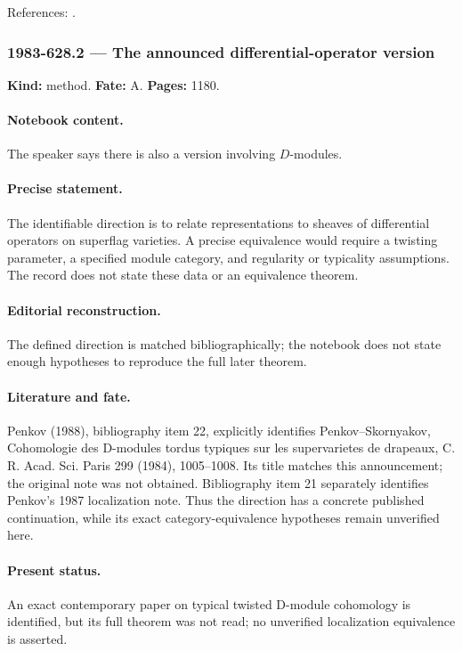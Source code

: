 \noindent References: \citep{penkov1988borel}.\par

\subsubsection{1983-628.2 --- The announced differential-operator version}

\label{item:1983-628.2}

\noindent\textbf{Kind:} method. \textbf{Fate:} A. \textbf{Pages:} 1180.\par

\paragraph{Notebook content.} The speaker says there is also a version involving \(D\)-modules.

\paragraph{Precise statement.} The identifiable direction is to relate representations to sheaves of differential operators on superflag varieties. A precise equivalence would require a twisting parameter, a specified module category, and regularity or typicality assumptions. The record does not state these data or an equivalence theorem.

\paragraph{Editorial reconstruction.} The defined direction is matched bibliographically; the notebook does not state enough hypotheses to reproduce the full later theorem.

\paragraph{Literature and fate.} Penkov (1988), bibliography item 22, explicitly identifies Penkov–Skornyakov, Cohomologie des D-modules tordus typiques sur les supervarietes de drapeaux, C. R. Acad. Sci. Paris 299 (1984), 1005–1008. Its title matches this announcement; the original note was not obtained. Bibliography item 21 separately identifies Penkov’s 1987 localization note. Thus the direction has a concrete published continuation, while its exact category-equivalence hypotheses remain unverified here.

\paragraph{Present status.} An exact contemporary paper on typical twisted D-module cohomology is identified, but its full theorem was not read; no unverified localization equivalence is asserted.

